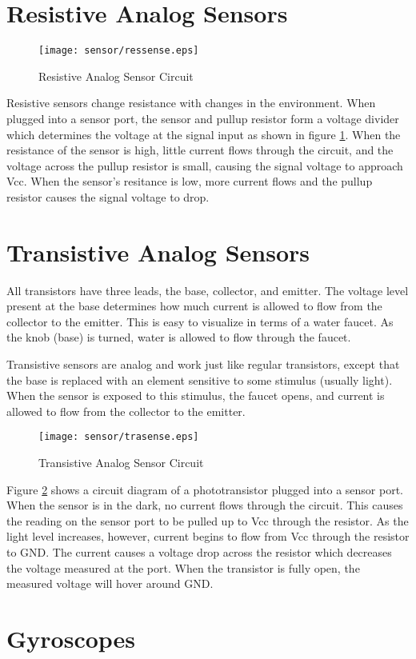 \section{Resistive Analog Sensors}

\begin{figure}[htbp]
\begin{center}
\texttt{[image: sensor/ressense.eps]}
\caption{Resistive Analog Sensor Circuit}
\label{ressense}
\end{center}
\end{figure}

Resistive sensors change resistance with changes in the
environment. When plugged into a sensor port, the sensor and pullup
resistor form a voltage divider which determines the voltage at the
signal input as shown in figure \ref{ressense}. When the resistance of
the sensor is high, little current flows through the circuit, and the
voltage across the pullup resistor is small, causing the signal
voltage to approach Vcc. When the sensor's resitance is low, more
current flows and the pullup resistor causes the signal voltage to
drop.



\section{Transistive Analog Sensors}

All transistors have three leads, the base, collector, and
emitter. The voltage level present at the base determines how much
current is allowed to flow from the collector to the emitter. This is
easy to visualize in terms of a water faucet. As the knob (base) is
turned, water is allowed to flow through the faucet.

Transistive sensors are analog and work just like regular transistors,
except that the base is replaced with an element sensitive to some
stimulus (usually light). When the sensor is exposed to this stimulus,
the faucet opens, and current is allowed to flow from the collector to
the emitter.

\begin{figure}[htbp]
\begin{center}
\texttt{[image: sensor/trasense.eps]}
\caption{Transistive Analog Sensor Circuit}
\label{trasense}
\end{center}
\end{figure}

Figure \ref{trasense} shows a circuit diagram of a phototransistor
plugged into a sensor port. When the sensor is in the dark, no current
flows through the circuit. This causes the reading on the sensor port
to be pulled up to Vcc through the resistor. As the light level
increases, however, current begins to flow from Vcc through the
resistor to GND. The current causes a voltage drop across the resistor
which decreases the voltage measured at the port. When the transistor
is fully open, the measured voltage will hover around GND.





\section{Gyroscopes}







